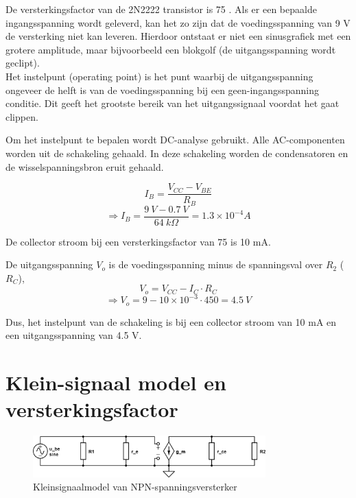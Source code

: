\documentclass{article}
\begin{document}
De versterkingsfactor van de 2N2222 transistor is 75 \cite[p.~3]{epo2-non-linear}. Als er een bepaalde ingangsspanning wordt geleverd, kan het zo zijn dat de voedingsspanning van 9 V de versterking niet kan leveren. Hierdoor ontstaat er niet een sinusgrafiek met een grotere amplitude, maar bijvoorbeeld een blokgolf (de uitgangsspanning wordt geclipt).\\

Het instelpunt (operating point) is het punt waarbij de uitgangsspanning ongeveer de helft is van de voedingsspanning bij een geen-ingangsspanning conditie. Dit geeft het grootste bereik van het uitgangssignaal voordat het gaat clippen. 

Om het instelpunt te bepalen wordt DC-analyse gebruikt. Alle AC-componenten worden uit de schakeling gehaald. In deze schakeling worden de condensatoren en de wisselspanningsbron eruit gehaald.

\begin{equation}
I_B=\frac{V_{CC}-V_{BE}}{R_B}
\end{equation}
$$\Rightarrow I_B=\frac{9\: V-0.7 \: V}{64 \: k \Omega}=1.3\times 10^{-4}A$$

\noindent De collector stroom bij een versterkingsfactor van 75 is 10 mA. 

\noindent De uitgangsspanning $V_o$ is de voedingsspanning minus de spanningsval over $R_2$ ($R_C$),
\begin{equation}
V_o=V_{CC}-I_{C} \cdot R_{C}
\end{equation}
$$\Rightarrow V_o=9-10\times 10^{-3}\cdot 450=4.5 \: V$$

\noindent Dus, het instelpunt van de schakeling is bij een collector stroom van 10 mA en een uitgangsspanning van 4.5 V.

\section*{Klein-signaal model en versterkingsfactor}

\begin{figure}[H]
	\centering
	\label{fig:npn-amplifier-kleinsignaal}
	\includegraphics[width=0.8\textwidth]{resource/npn-kleinsignaal-versterker}
	\caption{Kleinsignaalmodel van NPN-spanningsversterker}
\end{figure}
\end{document}
